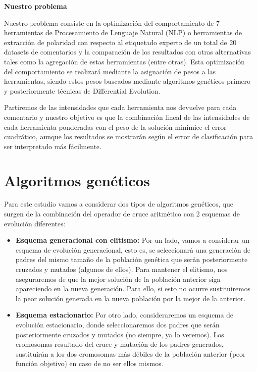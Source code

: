 \documentclass{article}
\begin{document}
\newpage
\textbf{Nuestro problema}

Nuestro problema consiste en la optimización del comportamiento de 7 herramientas de Procesamiento de Lenguaje Natural (NLP) o herramientas de extracción de polaridad con respecto al etiquetado experto de un total de 20 datasets de comentarios y la comparación de los resultados con otras alternativas tales como la agregación de estas herramientas (entre otras). Esta optimización del comportamiento se realizará mediante la asignación de pesos a las herramientas, siendo estos pesos buscados mediante algoritmos genéticos primero y posteriormente técnicas de Differential Evolution.

Partiremos de las intensidades que cada herramienta nos devuelve para cada comentario y nuestro objetivo es que la combinación lineal de las intensidades de cada herramienta ponderadas con el peso de la solución minimice el error cuadrático, aunque los resultados se mostrarán según el error de clasificación para ser interpretado más fácilmente.

\section{Algoritmos genéticos}
Para este estudio vamos a considerar dos tipos de algoritmos genéticos, que surgen de la combinación del operador de cruce aritmético con 2 esquemas de evolución diferentes:
\begin{itemize}
	\item \textbf{Esquema generacional con elitismo: } Por un lado, vamos a considerar un esquema de evolución generacional, esto es, se seleccionará una generación de padres del mismo tamaño de la población genética que serán posteriormente cruzados y mutados (algunos de ellos). Para mantener el elitismo, nos aseguraremos de que la mejor solución de la población anterior siga apareciendo en la nueva generación. Para ello, si esto no ocurre sustituiremos la peor solución generada en la nueva población por la mejor de la anterior.
	\item \textbf{Esquema estacionario: } Por otro lado, consideraremos un esquema de evolución estacionario, donde seleccionaremos dos padres que serán posteriormente cruzados y mutados (no siempre, ya lo veremos). Los cromosomas resultado del cruce y mutación de los padres generados, sustituirán a los dos cromosomas más débiles de la población anterior (peor función objetivo) en caso de no ser ellos mismos. 
\end{itemize}
\end{document}
